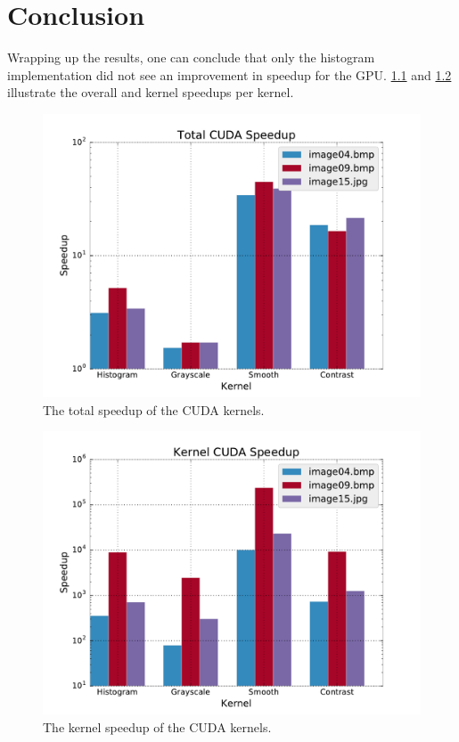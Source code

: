 \documentclass[final]{report}
\begin{document}
\chapter{Conclusion}

Wrapping up the results, one can conclude that only the histogram implementation did not see an improvement in speedup for the GPU. \cref{fig:total-cuda-speedup} and \cref{fig:kernel-cuda-speedup} illustrate the overall and kernel speedups per kernel.

\begin{figure}[H]
\centering
    \includegraphics[width=\linewidth]{resources/total-cuda-speedup-shared.pdf}
    \caption{The total speedup of the CUDA kernels.}
    \label{fig:total-cuda-speedup}
\end{figure}

\begin{figure}[H]
\centering
    \includegraphics[width=\linewidth]{resources/kernel-cuda-speedup-shared.pdf}
    \caption{The kernel speedup of the CUDA kernels.}
    \label{fig:kernel-cuda-speedup}
\end{figure}
\end{document}
